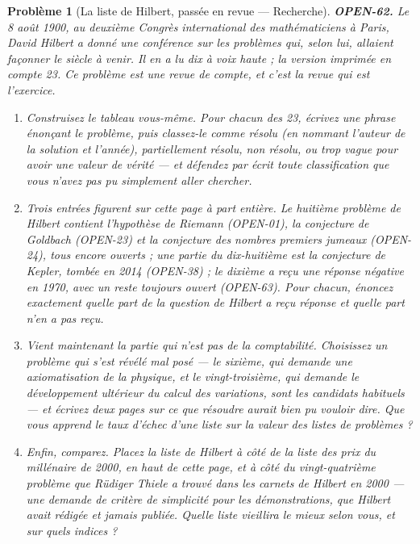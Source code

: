 \documentclass[11pt]{article}
\newtheorem{problem}{Problème}
\begin{document}
\begin{problem}[{La liste de Hilbert, passée en revue --- Recherche}]
\textbf{OPEN-62.} Le 8 août 1900, au deuxième Congrès international des mathématiciens à
Paris, David Hilbert a donné une conférence sur les problèmes qui, selon lui, allaient
façonner le siècle à venir. Il en a lu dix à voix haute ; la version imprimée en compte 23.
Ce problème est une revue de compte, et c'est la revue qui est l'exercice.
\begin{enumerate}
\item[(a)] Construisez le tableau vous-même. Pour chacun des 23, écrivez une phrase énonçant le
problème, puis classez-le comme résolu (en nommant l'auteur de la solution et l'année),
partiellement résolu, non résolu, ou trop vague pour avoir une valeur de vérité --- et
défendez par écrit toute classification que vous n'avez pas pu simplement aller
chercher.
\item[(b)] Trois entrées figurent sur cette page à part entière. Le huitième problème de Hilbert
contient l'hypothèse de Riemann (OPEN-01), la conjecture de Goldbach (OPEN-23) et la
conjecture des nombres premiers jumeaux (OPEN-24), tous encore ouverts ; une partie du
dix-huitième est la conjecture de Kepler, tombée en 2014 (OPEN-38) ; le dixième a reçu une
réponse négative en 1970, avec un reste toujours ouvert (OPEN-63). Pour chacun, énoncez
exactement quelle part de la question de Hilbert a reçu réponse et quelle part n'en a pas
reçu.
\item[(c)] Vient maintenant la partie qui n'est pas de la comptabilité. Choisissez un problème
qui s'est révélé mal posé --- le sixième, qui demande une axiomatisation de la physique, et
le vingt-troisième, qui demande le développement ultérieur du calcul des variations, sont
les candidats habituels --- et écrivez deux pages sur ce que \og{} résoudre \fg{} aurait bien pu
vouloir dire. Que vous apprend le taux d'échec d'une liste sur la valeur des listes de
problèmes ?
\item[(d)] Enfin, comparez. Placez la liste de Hilbert à côté de la liste des prix du millénaire
de 2000, en haut de cette page, et à côté du \og{} vingt-quatrième problème \fg{} que Rüdiger
Thiele a trouvé dans les carnets de Hilbert en 2000 --- une demande de critère de simplicité
pour les démonstrations, que Hilbert avait rédigée et jamais publiée. Quelle liste
vieillira le mieux selon vous, et sur quels indices ?
\end{enumerate}

\end{problem}
\end{document}
